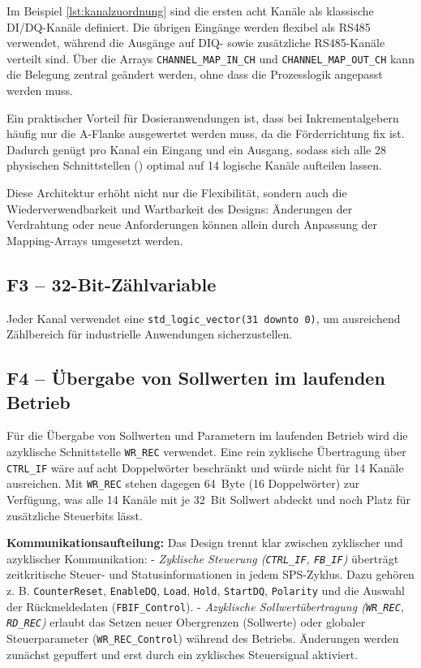 Im Beispiel \ref{lst:kanalzuordnung} sind die ersten acht Kanäle als klassische DI/DQ-Kanäle definiert. Die übrigen Eingänge werden flexibel als RS485 verwendet, während die Ausgänge auf DIQ- sowie zusätzliche RS485-Kanäle verteilt sind. Über die Arrays \texttt{CHANNEL\_MAP\_IN\_CH} und \texttt{CHANNEL\_MAP\_OUT\_CH} kann die Belegung zentral geändert werden, ohne dass die Prozesslogik angepasst werden muss.

Ein praktischer Vorteil für Dosieranwendungen ist, dass bei Inkrementalgebern häufig nur die A-Flanke ausgewertet werden muss, da die Förderrichtung fix ist. Dadurch genügt pro Kanal ein Eingang und ein Ausgang, sodass sich alle 28 physischen Schnittstellen (\cite{TmFast_progrmming_manual}) optimal auf 14 logische Kanäle aufteilen lassen. 

Diese Architektur erhöht nicht nur die Flexibilität, sondern auch die Wiederverwendbarkeit und Wartbarkeit des Designs: Änderungen der Verdrahtung oder neue Anforderungen können allein durch Anpassung der Mapping-Arrays umgesetzt werden.

\subsection*{F3 – 32-Bit-Zählvariable}
Jeder Kanal verwendet eine \texttt{std\_logic\_vector(31 downto 0)}, um ausreichend Zählbereich für industrielle Anwendungen sicherzustellen.

\subsection*{F4 – Übergabe von Sollwerten im laufenden Betrieb}

Für die Übergabe von Sollwerten und Parametern im laufenden Betrieb wird die azyklische Schnittstelle \texttt{WR\_REC} verwendet. Eine rein zyklische Übertragung über \texttt{CTRL\_IF} wäre auf acht Doppelwörter beschränkt und würde nicht für 14 Kanäle ausreichen. Mit \texttt{WR\_REC} stehen dagegen 64~Byte (16 Doppelwörter) zur Verfügung, was alle 14 Kanäle mit je 32~Bit Sollwert abdeckt und noch Platz für zusätzliche Steuerbits lässt.  

\textbf{Kommunikationsaufteilung:}  
Das Design trennt klar zwischen zyklischer und azyklischer Kommunikation:
- \emph{Zyklische Steuerung (\texttt{CTRL\_IF}, \texttt{FB\_IF})} überträgt zeitkritische Steuer- und Statusinformationen in jedem SPS-Zyklus. Dazu gehören z. B. \texttt{CounterReset}, \texttt{EnableDQ}, \texttt{Load}, \texttt{Hold}, \texttt{StartDQ}, \texttt{Polarity} und die Auswahl der Rückmeldedaten (\texttt{FBIF\_Control}).
- \emph{Azyklische Sollwertübertragung (\texttt{WR\_REC}, \texttt{RD\_REC})} erlaubt das Setzen neuer Obergrenzen (Sollwerte) oder globaler Steuerparameter (\texttt{WR\_REC\_Control}) während des Betriebs. Änderungen werden zunächst gepuffert und erst durch ein zyklisches Steuersignal aktiviert.

